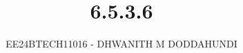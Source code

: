 \documentclass[journal]{IEEEtran}
\begin{document}

\vspace{3cm}

\title{6.5.3.6}
\author{EE24BTECH11016 - DHWANITH M DODDAHUNDI}
 \maketitle
{\let\newpage\relax\maketitle}

\renewcommand{\thefigure}{\theenumi}
\renewcommand{\thetable}{\theenumi}
\setlength{\intextsep}{10pt} %


\renewcommand{\thetable}{\theenumi}
\end{document}

